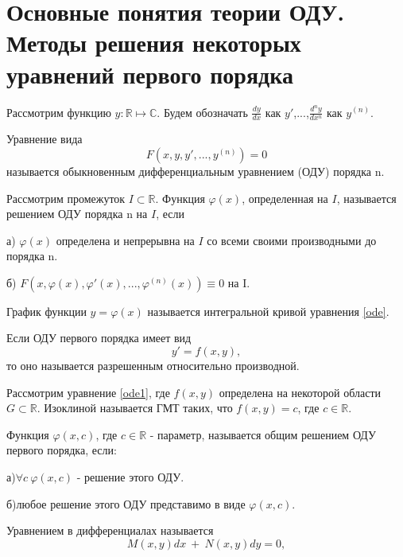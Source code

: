 \documentclass[document.tex]{subfiles}
\begin{document}
\section{Основные понятия теории ОДУ. Методы решения некоторых уравнений первого порядка}
Рассмотрим функцию $y:\mathbb{R}\mapsto\mathbb{C}$. Будем обозначать $\frac{dy}{dx}$ как $y'$,...,$\frac{d^ny}{dx^n}$ как $y^{(n)}$.
\begin{definition}
Уравнение вида
\begin{equation}
F(x,y,y',...,y^{(n)})=0 
\label{ode}
\end{equation}  называется обыкновенным дифференциальным уравнением (ОДУ) порядка n.
\end{definition}
\begin{definition}
Рассмотрим промежуток $I \subset \mathbb{R}$. Функция $\varphi(x)$, определенная на $I$, называется решением ОДУ порядка n на $I$, если


а) $\varphi(x)$ определена и непрерывна  на $I$ со всеми своими производными до порядка n.


б) $F(x,\varphi(x),\varphi'(x),...,\varphi^{(n)}(x))\equiv0$ на I.
\end{definition}
\begin{definition}
График функции $y=\varphi(x)$ называется интегральной кривой уравнения \ref{ode}.
\end{definition}
Если ОДУ первого порядка имеет вид 
\begin{equation}
y'=f(x,y), \label{ode1}
\end{equation}то оно называется разрешенным относительно производной.
\begin{definition}
Рассмотрим уравнение \ref{ode1}, где $f(x,y)$ определена на некоторой области $G \subset \mathbb{R}$. Изоклиной называется ГМТ таких, что $f(x,y)=c$, где $c \in \mathbb{R}$.
\end{definition}
\begin{definition}
Функция $\varphi(x,c)$, где $c \in \mathbb{R}$ - параметр, называется общим решением ОДУ первого порядка, если:

а)$\forall c\ \varphi(x,c)$ - решение этого ОДУ.

б)любое решение этого ОДУ представимо в виде $\varphi(x,c)$.
\end{definition}
\begin{definition}
Уравнением в дифференциалах называется 
\begin{equation}
M(x,y)dx\ +\ N(x,y)dy=0, \label{odedif}
\end{equation}
\end{definition}
\end{document}
